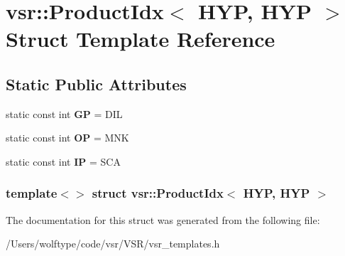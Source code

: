 \hypertarget{structvsr_1_1_product_idx_3_01_h_y_p_00_01_h_y_p_01_4}{\section{vsr\-:\-:Product\-Idx$<$ H\-Y\-P, H\-Y\-P $>$ Struct Template Reference}
\label{structvsr_1_1_product_idx_3_01_h_y_p_00_01_h_y_p_01_4}
}
\subsection*{Static Public Attributes}
\begin{DoxyCompactItemize}
\item 
\hypertarget{structvsr_1_1_product_idx_3_01_h_y_p_00_01_h_y_p_01_4_a5e9d161aa084c99a1f9c5cc7207b7759}{static const int {\bfseries G\-P} = D\-I\-L}\label{structvsr_1_1_product_idx_3_01_h_y_p_00_01_h_y_p_01_4_a5e9d161aa084c99a1f9c5cc7207b7759}

\item 
\hypertarget{structvsr_1_1_product_idx_3_01_h_y_p_00_01_h_y_p_01_4_a6238e337b45de57bbaa2804fc1eaa6e1}{static const int {\bfseries O\-P} = M\-N\-K}\label{structvsr_1_1_product_idx_3_01_h_y_p_00_01_h_y_p_01_4_a6238e337b45de57bbaa2804fc1eaa6e1}

\item 
\hypertarget{structvsr_1_1_product_idx_3_01_h_y_p_00_01_h_y_p_01_4_a596ebb5fb022d39fc0513fcaa05371e8}{static const int {\bfseries I\-P} = S\-C\-A}\label{structvsr_1_1_product_idx_3_01_h_y_p_00_01_h_y_p_01_4_a596ebb5fb022d39fc0513fcaa05371e8}

\end{DoxyCompactItemize}
\subsubsection*{template$<$$>$ struct vsr\-::\-Product\-Idx$<$ H\-Y\-P, H\-Y\-P $>$}



The documentation for this struct was generated from the following file\-:\begin{DoxyCompactItemize}
\item 
/\-Users/wolftype/code/vsr/\-V\-S\-R/vsr\-\_\-templates.\-h\end{DoxyCompactItemize}
